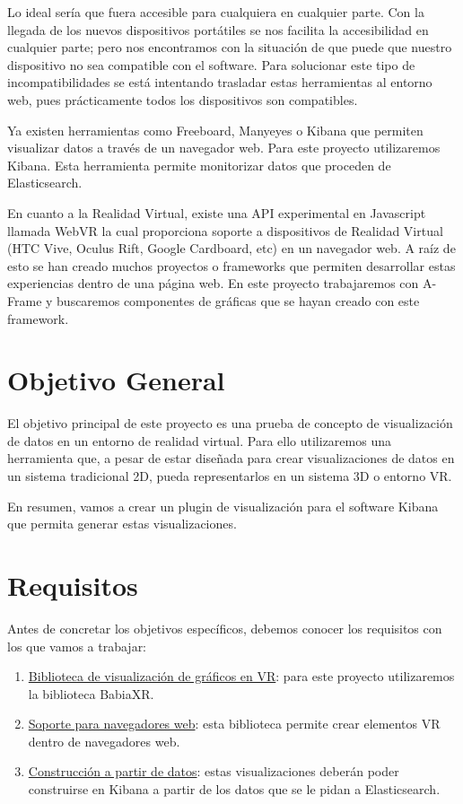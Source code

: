 \documentclass[a4paper, 12pt]{book}
\begin{document}
Lo ideal sería que fuera accesible para cualquiera en cualquier parte. Con la llegada de los nuevos dispositivos portátiles se nos facilita la accesibilidad en cualquier parte; pero nos encontramos con la situación de que puede que nuestro dispositivo no sea compatible con el software. Para solucionar este tipo de incompatibilidades se está intentando trasladar estas herramientas al entorno web, pues prácticamente todos los dispositivos son compatibles.

Ya existen herramientas como Freeboard, Manyeyes o Kibana que permiten visualizar datos a través de un navegador web. Para este proyecto utilizaremos Kibana. Esta herramienta permite monitorizar datos que proceden de Elasticsearch.

En cuanto a la Realidad Virtual, existe una API experimental en Javascript llamada WebVR la cual proporciona soporte a dispositivos de Realidad Virtual (HTC Vive, Oculus Rift, Google Cardboard, etc) en un navegador web. A raíz de esto se han creado muchos proyectos o frameworks que permiten desarrollar estas experiencias dentro de una página web. En este proyecto trabajaremos con A-Frame y buscaremos componentes de gráficas que se hayan creado con este framework.



\section{Objetivo General}
\label{sec:objetivogeneral}

El objetivo principal de este proyecto es una prueba de concepto de visualización de datos en un entorno de realidad virtual. Para ello utilizaremos una herramienta que, a pesar de estar diseñada para crear visualizaciones de datos en un sistema tradicional 2D, pueda representarlos en un sistema 3D o entorno VR.

En resumen, vamos a crear un plugin de visualización para el software Kibana que permita generar estas visualizaciones.

\section{Requisitos}
\label{sec:requisitos}
Antes de concretar los objetivos específicos, debemos conocer los requisitos con los que vamos a trabajar:

\begin{enumerate}
    \item \underline{Biblioteca de visualización de gráficos en VR}: para este proyecto utilizaremos la biblioteca BabiaXR.
    \item \underline{Soporte para navegadores web}: esta biblioteca permite crear elementos VR dentro de navegadores web. 
    \item \underline{Construcción a partir de datos}: estas visualizaciones deberán poder construirse en Kibana a partir de los datos que se le pidan a Elasticsearch.
    
\end{enumerate}
\end{document}
